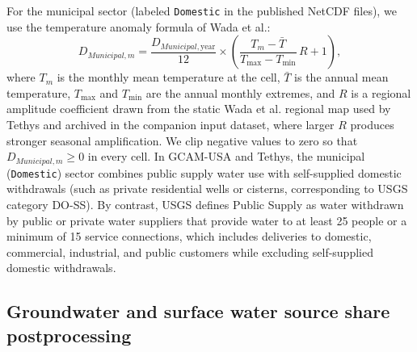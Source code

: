 \documentclass[fleqn,10pt]{wlscirep}
\begin{document}
For the municipal sector (labeled \texttt{Domestic} in the published NetCDF files), we use the temperature anomaly formula of Wada et al.\cite{Wada2011}:
\begin{equation}
D_{Municipal,m} = \frac{D_{Municipal,\mathrm{year}}}{12} \times \left(\frac{T_m - \bar{T}}{T_{\max} - T_{\min}}\,R + 1\right),
\label{eq:dom-monthly}
\end{equation}
where $T_m$ is the monthly mean temperature at the cell, $\bar{T}$ is the annual mean temperature, $T_{\max}$ and $T_{\min}$ are the annual monthly extremes, and $R$ is a regional amplitude coefficient drawn from the static Wada et al.\cite{Wada2011} regional map used by Tethys\cite{niazi_2026_20552731} and archived in the companion input dataset\cite{brackenDataTethys_integration_metarepo}, where larger $R$ produces stronger seasonal amplification. We clip negative values to zero so that $D_{Municipal,m} \ge 0$ in every cell. In GCAM-USA and Tethys, the municipal (\texttt{Domestic}) sector combines public supply water use with self-supplied domestic withdrawals (such as private residential wells or cisterns, corresponding to USGS category DO-SS). By contrast, USGS defines Public Supply as water withdrawn by public or private water suppliers that provide water to at least 25 people or a minimum of 15 service connections, which includes deliveries to domestic, commercial, industrial, and public customers while excluding self-supplied domestic withdrawals.

\subsection*{Groundwater and surface water source share postprocessing}
\end{document}
